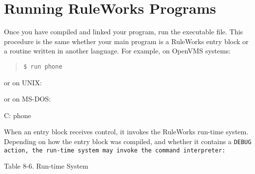 \section{Running RuleWorks Programs}

Once you have compiled and linked your program, run the
executable file. This procedure is the same whether your
main program is a RuleWorks entry block or a routine
written in another language. For example, on OpenVMS
systems:
\begin{quote}
\begin{verbatim}
$ run phone
\end{verbatim}
\end{quote}
or on UNIX:
\begin{qv}
\end{qv}
or on MS-DOS:
\begin{qv}
C:\> phone
\end{qv}
When an entry block receives control, it invokes the
RuleWorks run-time system. Depending on how the entry
block was compiled, and whether it contains a \tt{DEBUG}
action, the run-time system may invoke the command
interpreter:

Table 8-6. Run-time System

